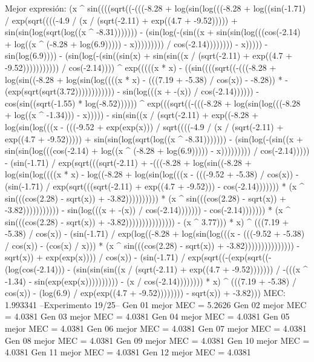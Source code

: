 Mejor expresión: (x ^ sin((((sqrt((-(((-8.28 + log(sin(log(((-8.28 + log((sin(-1.71) / exp(sqrt((((-4.9 / (x / (sqrt(-2.11) + exp((4.7 + -9.52))))) + sin(sin(log(sqrt(log((x ^ -8.31))))))) - (sin(log(-(sin((x + sin(sin(log(((cos(-2.14) + log((x ^ (-8.28 + log(6.9))))) - x))))))))) / cos(-2.14)))))))) - x))))) - sin(log(6.9)))) - (sin(log(-(sin((sin(x) + sin(sin((x / (sqrt(-2.11) + exp((4.7 + -9.52))))))))))) / cos(-2.14)))) ^ exp(((((x * x) - ((sin((((sqrt((-(((-8.28 + log(sin((-8.28 + log(sin(log((((x * x) - (((7.19 + -5.38) / cos(x)) - -8.28)) * -(exp(sqrt(sqrt(3.72)))))))))))) - sin(log(((x + -(x)) / cos(-2.14)))))) - cos(sin((sqrt(-1.55) * log(-8.52)))))) ^ exp(((sqrt((-(((-8.28 + log(sin(log(((-8.28 + log((x ^ -1.34))) - x))))) - sin(sin((x / (sqrt(-2.11) + exp((-8.28 + log(sin(log(((x - (((-9.52 + exp(exp(x))) / sqrt((((-4.9 / (x / (sqrt(-2.11) + exp((4.7 + -9.52))))) + sin(sin(log(sqrt(log((x ^ -8.31))))))) - (sin(log(-(sin((x + sin(sin(log(((cos(-2.14) + log((x ^ (-8.28 + log(6.9))))) - x))))))))) / cos(-2.14))))) - (sin(-1.71) / exp(sqrt(((sqrt(-2.11) + -(((-8.28 + log(sin((-8.28 + log(sin(log((((x * x) - log((-8.28 + log(sin(log(((x - (((-9.52 + -5.38) / cos(x)) - (sin(-1.71) / exp(sqrt(((sqrt(-2.11) + exp((4.7 + -9.52))) - cos(-2.14))))))) * (x ^ sin(((cos(2.28) - sqrt(x)) + -3.82)))))))))) * (x ^ sin(((cos(2.28) - sqrt(x)) + -3.82))))))))))) - sin(log(((x + -(x)) / cos(-2.14))))))) - cos(-2.14))))))) * (x ^ sin(((cos(2.28) - sqrt(x)) + -3.82))))))))))))))) - (x ^ 3.77))) * x) ^ (((7.19 + -5.38) / cos(x)) - (sin(-1.71) / exp(log((-8.28 + log(sin(log(((x - (((-9.52 + -5.38) / cos(x)) - (cos(x) / x))) * (x ^ sin(((cos(2.28) - sqrt(x)) + -3.82))))))))))))))) - sqrt(x)) + exp(exp(x)))) / cos(x)) - (sin(-1.71) / exp(sqrt((-(exp(sqrt((-(log(cos(-2.14))) - (sin(sin(sin((x / (sqrt(-2.11) + exp((4.7 + -9.52))))))) / -(((x ^ -1.34) - sin(exp(exp(x)))))))))) - (x / cos(-2.14)))))))) * x) ^ (((7.19 + -5.38) / cos(x)) - (log(6.9) / exp(exp((4.7 + -9.52)))))))) - sqrt(x)) + -3.82)))
MEC: 1.993341
--Experimento 
 19/25--
Gen 01 mejor MEC = 5.2626
Gen 02 mejor MEC = 4.0381
Gen 03 mejor MEC = 4.0381
Gen 04 mejor MEC = 4.0381
Gen 05 mejor MEC = 4.0381
Gen 06 mejor MEC = 4.0381
Gen 07 mejor MEC = 4.0381
Gen 08 mejor MEC = 4.0381
Gen 09 mejor MEC = 4.0381
Gen 10 mejor MEC = 4.0381
Gen 11 mejor MEC = 4.0381
Gen 12 mejor MEC = 4.0381

